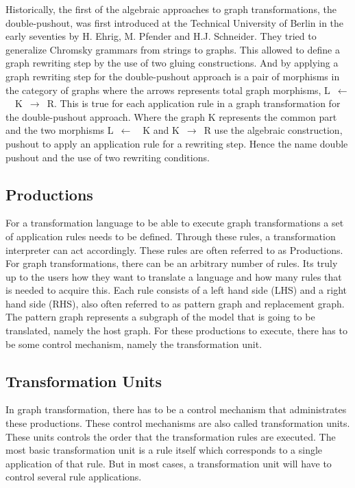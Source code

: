 Historically, the first of the algebraic approaches to graph
transformations, the double-pushout, was first introduced at the Technical
University of Berlin in the early seventies by H. Ehrig, M. Pfender and H.J.
Schneider\cite{INSPEC:606170}. They tried to generalize Chromsky grammars from
strings to graphs. This allowed to define a graph rewriting step by the use of
two gluing constructions. And by applying a graph rewriting step for the
double-pushout approach is a pair of morphisms in the category of graphs where
the arrows represents total graph morphisms, \mbox{L $\longleftarrow$
\ K $\longrightarrow$ R}. This is true for each application rule in a graph
transformation for the double-pushout approach. Where the graph K represents the
common part and the two morphisms \mbox{L $\longleftarrow$ \ K} and \mbox{K
$\longrightarrow$ R} use the algebraic construction, pushout to apply an
application rule for a rewriting step. Hence the name double pushout and the use
of two rewriting conditions.

\subsection{Productions}
For a transformation language to be able to execute graph
transformations a set of application rules needs to be defined. Through these
rules, a transformation interpreter can act accordingly. These rules are often
referred to as Productions. For graph transformations, there can be an arbitrary
number of rules. Its truly up to the users how they want to translate a
language and how many rules that is needed to acquire this. Each rule consists
of a left hand side (LHS) and a right hand side (RHS), also often referred to as
pattern graph and replacement graph. The pattern graph represents a subgraph of
the model that is going to be translated, namely the host graph. For these
productions to execute, there has to be some control mechanism, namely the
transformation unit.

\subsection{Transformation Units}
In graph transformation, there has to be a control mechanism that
administrates these productions. These control mechanisms are also called
transformation units. These units controls the order that the transformation
rules are executed. The most basic transformation unit is a rule itself which
corresponds to a single application of that rule. But in most cases, a
transformation unit will have to control several rule applications. 

